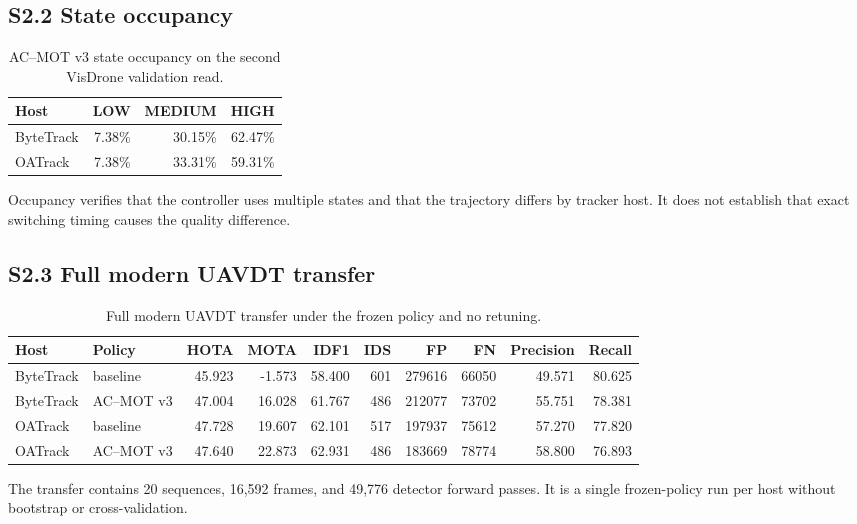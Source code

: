 \documentclass[11pt]{article}
\begin{document}
\subsection*{S2.2 State occupancy}

\begin{table}[ht]
\centering\small
\caption{AC--MOT v3 state occupancy on the second VisDrone validation read.}
\label{tab:s2-occupancy}
\begin{tabular}{lrrr}
\toprule
Host & LOW & MEDIUM & HIGH\\
\midrule
ByteTrack & 7.38\% & 30.15\% & 62.47\%\\
OATrack & 7.38\% & 33.31\% & 59.31\%\\
\bottomrule
\end{tabular}
\end{table}

Occupancy verifies that the controller uses multiple states and that the
trajectory differs by tracker host. It does not establish that exact switching
timing causes the quality difference.

\subsection*{S2.3 Full modern UAVDT transfer}

\begin{table}[ht]
\centering\scriptsize
\caption{Full modern UAVDT transfer under the frozen policy and no retuning.}
\label{tab:s2-uavdt}
\begin{tabular}{llrrrrrrrr}
\toprule
Host & Policy & HOTA & MOTA & IDF1 & IDS & FP & FN & Precision & Recall\\
\midrule
ByteTrack & baseline & 45.923 & -1.573 & 58.400 & 601 & 279616 & 66050 & 49.571 & 80.625\\
ByteTrack & AC--MOT v3 & 47.004 & 16.028 & 61.767 & 486 & 212077 & 73702 & 55.751 & 78.381\\
OATrack & baseline & 47.728 & 19.607 & 62.101 & 517 & 197937 & 75612 & 57.270 & 77.820\\
OATrack & AC--MOT v3 & 47.640 & 22.873 & 62.931 & 486 & 183669 & 78774 & 58.800 & 76.893\\
\bottomrule
\end{tabular}
\end{table}

The transfer contains 20 sequences, 16,592 frames, and 49,776 detector
forward passes. It is a single frozen-policy run per host without bootstrap or
cross-validation.
\end{document}
